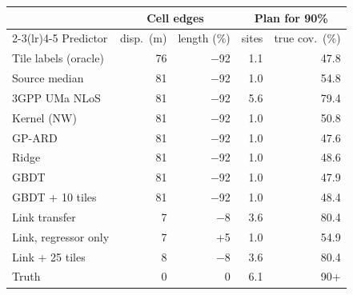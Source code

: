 \begin{tabular}{lrrrr}
\toprule
& \multicolumn{2}{c}{Cell edges} & \multicolumn{2}{c}{Plan for 90\%} \\
\cmidrule(lr){2-3}\cmidrule(lr){4-5}
Predictor & disp.\ (m) & length (\%) & sites & true cov.\ (\%) \\
\midrule
Tile labels (oracle) & 76 & \ensuremath{-}92 & 1.1 & 47.8 \\
\midrule
Source median & 81 & \ensuremath{-}92 & 1.0 & 54.8 \\
3GPP UMa NLoS & 81 & \ensuremath{-}92 & 5.6 & 79.4 \\
Kernel (NW) & 81 & \ensuremath{-}92 & 1.0 & 50.8 \\
GP-ARD & 81 & \ensuremath{-}92 & 1.0 & 47.6 \\
Ridge & 81 & \ensuremath{-}92 & 1.0 & 48.6 \\
GBDT & 81 & \ensuremath{-}92 & 1.0 & 47.9 \\
GBDT + 10 tiles & 81 & \ensuremath{-}92 & 1.0 & 48.4 \\
\midrule
Link transfer & 7 & \ensuremath{-}8 & 3.6 & 80.4 \\
Link, regressor only & 7 & +5 & 1.0 & 54.9 \\
Link + 25 tiles & 8 & \ensuremath{-}8 & 3.6 & 80.4 \\
\midrule
Truth & 0 & 0 & 6.1 & 90+ \\
\bottomrule
\end{tabular}
